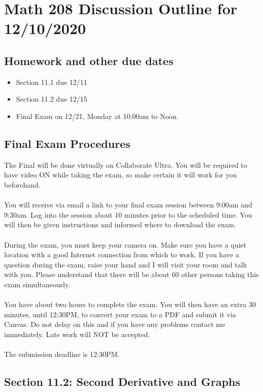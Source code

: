 \documentclass[14pt]{extarticle}
\begin{document}
\section*{Math 208 Discussion Outline for 12/10/2020}


\subsection{Homework and other due dates}
\begin{itemize}
\item Section 11.1 due 12/11
\item Section 11.2 due 12/15
\item Final Exam on 12/21, Monday at 10:00am to Noon. 
\end{itemize}

\subsection{Final Exam Procedures}
The Final will be done virtually on Collaborate Ultra. You will be required to have video ON while taking the exam, so make certain it will work for you beforehand.
\\\\
You will receive via email a link to your final exam session between 9:00am and 9:30am. Log into the session about 10 minutes prior to the scheduled time. You will then be given instructions and informed where to download the exam.
\\\\
During the exam, you must keep your camera on. Make sure you have a quiet location with a good Internet connection from which to work. If you have a question during the exam, raise your hand and I will visit your room and talk with you. Please understand that there will be about 60 other persons taking this exam simultaneously.
\\\\
You have about two hours to complete the exam. You will then have an extra 30 minutes, until 12:30PM, to convert your exam to a PDF and submit it via Canvas. Do not delay on this and if you have any problems contact me immediately. Late work will NOT be accepted.
\\\\
The submission deadline is 12:30PM.

\subsection{Section 11.2: Second Derivative and Graphs}
\end{document}
